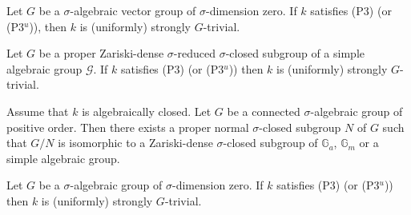 \documentclass[10pt,a4paper]{amsart}
\newcommand{\Ga}{\mathbb{G}_a}
\newcommand{\Gm}{\mathbb{G}_m}
\newcommand{\G}{\ensuremath{\mathcal{G}}}
\newcommand{\ptweak}{{\rm{(P3)}}}
\newcommand{\pt}{{\rm{(P3$^u$)}}}
\newcommand{\s}{\ensuremath{\sigma}}
\begin{document}
	\begin{prop} \label{prop: vector groups of sdim 0 are strongly trivial}
 Let $G$ be a $\s$-algebraic vector group of $\s$-dimension zero. 
		If $k$ satisfies  \ptweak{} (or \pt{}), then $k$ is (uniformly) strongly $G$-trivial.
	\end{prop}

\begin{prop} \label{prop: Zariski dense in simple}
Let $G$ be a proper Zariski-dense $\s$-reduced $\s$-closed subgroup of a simple algebraic group $\G$. If $k$ satisfies \ptweak{} (or \pt{}) then $k$ is (uniformly) strongly $G$-trivial.
\end{prop}

\begin{lemma} \label{lemma: embedd into Ga Gm or simple}
	Assume that $k$ is algebraically closed. Let $G$ be a connected $\s$-algebraic group of positive order. Then there exists a proper normal $\s$-closed subgroup $N$ of $G$ such that $G/N$ is isomorphic to a Zariski-dense $\s$-closed subgroup of $\Ga$, $\Gm$ or a simple algebraic group.	
\end{lemma}

\begin{prop} \label{prop: sdim zero}
	Let $G$ be a $\s$-algebraic group of $\s$-dimension zero. If $k$ satisfies \ptweak{} (or \pt{}) then $k$ is (uniformly) strongly $G$-trivial.
\end{prop}
\end{document}
